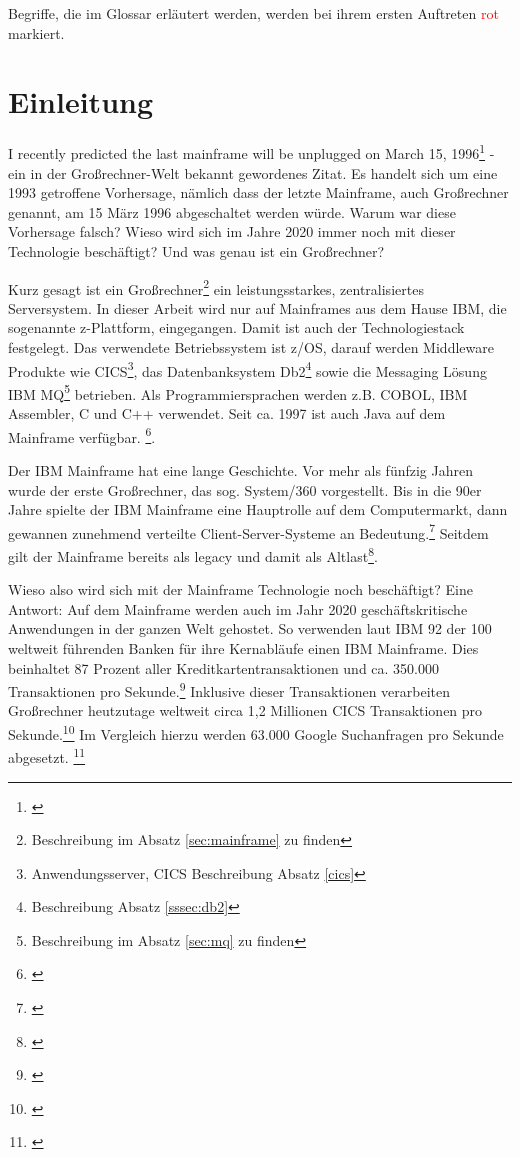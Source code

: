 Begriffe, die im Glossar erläutert werden, werden bei ihrem ersten Auftreten \textcolor{red}{rot} markiert.

\chapter{Einleitung}\label{ch:einleitung}
\glqq I recently predicted the last mainframe will be unplugged on March 15, 1996\grqq\footnote{\cite{Alsop.1993}} - ein in der Großrechner-Welt bekannt gewordenes Zitat.
Es handelt sich um eine 1993 getroffene Vorhersage, nämlich dass der letzte Mainframe, auch Großrechner genannt, am 15 März 1996 abgeschaltet werden würde.
Warum war diese Vorhersage falsch? 
Wieso wird sich im Jahre 2020 immer noch mit dieser Technologie beschäftigt? 
Und was genau ist ein Großrechner?

Kurz gesagt ist ein Großrechner\footnote{Beschreibung im Absatz \ref{sec:mainframe} zu finden} ein leistungsstarkes, zentralisiertes Serversystem.
In dieser Arbeit wird nur auf Mainframes aus dem Hause IBM, die sogenannte z-Plattform, eingegangen.
Damit ist auch der Technologiestack festgelegt.
Das verwendete Betriebssystem ist z/OS, darauf werden Middleware Produkte wie CICS\footnote{Anwendungsserver, CICS Beschreibung Absatz \ref{cics}}, das Datenbanksystem Db2\footnote{ Beschreibung Absatz \ref{sssec:db2}} sowie die Messaging Lösung \glqq IBM MQ\grqq{}\footnote{Beschreibung im Absatz \ref{sec:mq} zu finden} betrieben.
Als Programmiersprachen werden z.B. COBOL, IBM Assembler, C und C++ verwendet. 
Seit ca. 1997 ist auch Java auf dem Mainframe verfügbar. \footnote{\cite{Steegmans.2003}}.

Der IBM Mainframe hat eine lange Geschichte.
Vor mehr als fünfzig Jahren wurde der erste Großrechner, das sog. \glqq System/360\grqq{} vorgestellt.
Bis in die 90er Jahre spielte der IBM Mainframe eine Hauptrolle auf dem Computermarkt, dann gewannen zunehmend verteilte Client-Server-Systeme an Bedeutung.\footnote{\cite{Ceruzzi.2003}}
Seitdem gilt der Mainframe bereits als \glqq  legacy\grqq{} und damit als \glqq Altlast\grqq\footnote{\cite{.22.2.2020}}.

Wieso also wird sich mit der Mainframe Technologie noch beschäftigt? Eine Antwort: Auf dem Mainframe werden auch im Jahr 2020 geschäftskritische Anwendungen in der ganzen Welt gehostet.
So verwenden laut IBM 92 der 100 weltweit führenden Banken für ihre Kernabläufe einen IBM Mainframe.
Dies beinhaltet 87 Prozent aller Kreditkartentransaktionen und ca. 350.000 Transaktionen pro Sekunde.\footnote{\cite{.25.2.2020c}}
Inklusive dieser Transaktionen verarbeiten Großrechner heutzutage weltweit circa 1,2 Millionen CICS Transaktionen pro Sekunde.\footnote{\cite{.23.11.2019b}}
Im Vergleich hierzu werden 63.000 Google Suchanfragen pro Sekunde abgesetzt.  \footnote{\cite{.02.12.2019}}

